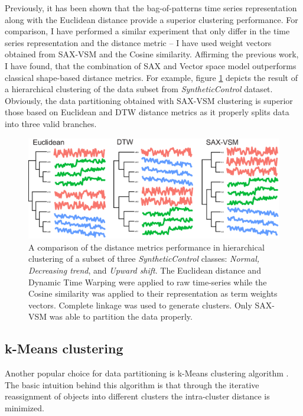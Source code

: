 Previously, it has been shown that the bag-of-patterns time series representation along with the Euclidean distance
provide a superior clustering performance\cite{citeulike:10525778}. 
For comparison, I have performed a similar experiment that only differ in the time series representation and
the distance metric -- I have used \tfidf weight vectors obtained from SAX-VSM and the Cosine similarity. 
Affirming the previous work, I have found, that the combination of SAX and Vector space model outperforms 
classical shape-based distance metrics. 
For example, figure \ref{fig:hc} depicts the result of a hierarchical clustering of the data subset from 
\textit{SyntheticControl} dataset. 
Obviously, the data partitioning obtained with SAX-VSM clustering is superior those based on Euclidean and DTW 
distance metrics as it properly splits data into three valid branches.

\begin{figure}[!h!t]
   \centering
   \includegraphics[width=120mm]{figures/clustering.eps}
   \caption{A comparison of the distance metrics performance in hierarchical clustering of a subset of three
   \textit{SyntheticControl} classes: \textit{Normal, Decreasing trend}, and \textit{Upward shift}. 
   The Euclidean distance and Dynamic Time Warping were applied to raw time-series while the Cosine similarity 
   was applied to their representation as term weights vectors. Complete linkage was used to generate clusters. 
   Only SAX-VSM was able to partition the data properly.   }
   \label{fig:hc}
\end{figure}

\subsection{k-Means clustering}
Another popular choice for data partitioning is k-Means clustering algorithm \cite{kmeans}.
The basic intuition behind this algorithm is that through the iterative reassignment of objects 
into different clusters the intra-cluster distance is minimized. 

